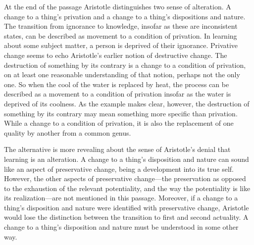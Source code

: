 At the end of the passage Aristotle distinguishes two sense of alteration. A change to a thing's privation and a change to a thing's dispositions and nature. The transition from ignorance to knowledge, insofar as these are inconsistent states, can be described as movement to a condition of privation. In learning about some subject matter, a person is deprived of their ignorance. Privative change seems to echo Aristotle's earlier notion of destructive change. The destruction of something by its contrary is a change to a condition of privation, on at least one reasonable understanding of that notion, perhaps not the only one. So when the cool of the water is replaced by heat, the process can be described as a movement to a condition of privation insofar as the water is deprived of its coolness. As the example makes clear, however, the destruction of something by its contrary may mean something more specific than privation. While a change to a condition of privation, it is also the replacement of one quality by another from a common genus. 

The alternative is more revealing about the sense of Aristotle's denial that learning is an alteration. A change to a thing's disposition and nature can sound like an aspect of preservative change, being a development into its true self. However, the other aspects of preservative change---the preservation as opposed to the exhaustion of the relevant potentiality, and the way the potentiality is like its realization---are not mentioned in this passage. Moreover, if a change to a thing's disposition and nature were identified with preservative change, Aristotle would lose the distinction between the transition to first and second actuality. A change to a thing's disposition and nature must be understood in some other way.

